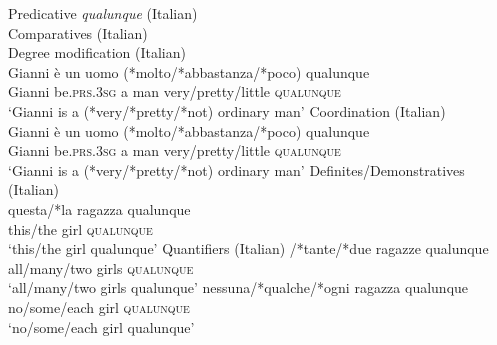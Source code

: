 \documentclass[output=paper,colorlinks,citecolor=brown]{langscibook}
\begin{document}
\ea\label{ex:fk3} Predicative \textit{qualunque} (Italian)\\
    \z
\ex \label{ex:fk4} Comparatives (Italian)\\
    \z
\ex\label{ex:fk5} Degree modification (Italian)\\
    \gll Gianni è un uomo (*molto/*abbastanza/*poco) qualunque\\
    Gianni be.\textsc{prs.3sg} a man very/pretty/little \textsc{qualunque}\\
    \glt ‘Gianni is a (*very/*pretty/*not) ordinary man’
\ex \label{ex:fk6} Coordination (Italian)\\
    \gll Gianni è un uomo (*molto/*abbastanza/*poco) qualunque\\
    Gianni be.\textsc{prs.3sg} a man very/pretty/little \textsc{qualunque}\\
    \glt ‘Gianni is a (*very/*pretty/*not) ordinary man’
\ex\label{ex:fk7} Definites/Demonstratives (Italian)\\
    \gll *questa/*la ragazza qualunque\\
    this/the girl \textsc{qualunque}\\
    \glt ‘this/the girl qualunque’
\ex\label{ex:fk8} Quantifiers (Italian)
    \ea {}/*tante/*due ragazze qualunque\\
        all/many/two girls \textsc{qualunque}\\
       \glt ‘all/many/two girls qualunque’
     \ex \gll *nessuna/*qualche/*ogni ragazza qualunque\\
         no/some/each girl \textsc{qualunque}\\
        \glt ‘no/some/each girl qualunque’
    \z
\z
\end{document}
